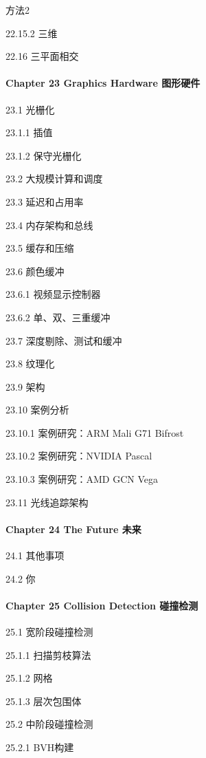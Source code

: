 \documentclass[
  paper=a4,
  ,captions=tableheading
]{scrartcl}
\begin{document}
方法2

22.15.2 三维

22.16 三平面相交

\paragraph{Chapter 23 Graphics Hardware
图形硬件}\label{chapter-23-graphics-hardware-ux56feux5f62ux786cux4ef6}

23.1 光栅化

23.1.1 插值

23.1.2 保守光栅化

23.2 大规模计算和调度

23.3 延迟和占用率

23.4 内存架构和总线

23.5 缓存和压缩

23.6 颜色缓冲

23.6.1 视频显示控制器

23.6.2 单、双、三重缓冲

23.7 深度剔除、测试和缓冲

23.8 纹理化

23.9 架构

23.10 案例分析

23.10.1 案例研究：ARM Mali G71 Bifrost

23.10.2 案例研究：NVIDIA Pascal

23.10.3 案例研究：AMD GCN Vega

23.11 光线追踪架构

\paragraph{Chapter 24 The Future
未来}\label{chapter-24-the-future-ux672aux6765}

24.1 其他事项

24.2 你

\paragraph{Chapter 25 Collision Detection
碰撞检测}\label{chapter-25-collision-detection-ux78b0ux649eux68c0ux6d4b}

25.1 宽阶段碰撞检测

25.1.1 扫描剪枝算法

25.1.2 网格

25.1.3 层次包围体

25.2 中阶段碰撞检测

25.2.1 BVH构建
\end{document}
